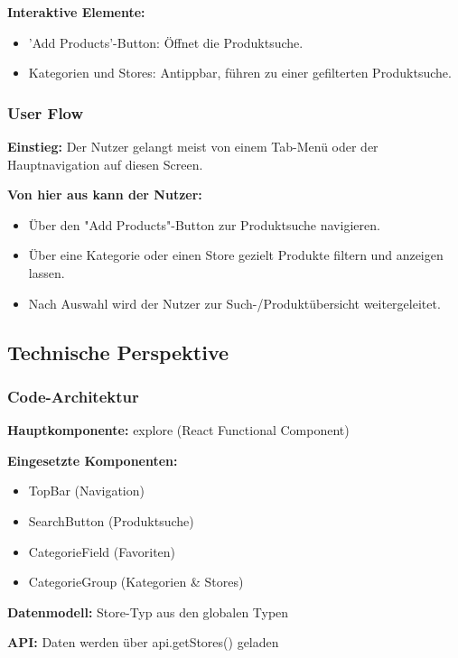 \documentclass[12pt, a4paper]{report} %
\begin{document}
\noindent\textbf{Interaktive Elemente:}
\begin{itemize}
    \item 'Add Products'-Button: Öffnet die Produktsuche.
    \item Kategorien und Stores: Antippbar, führen zu einer gefilterten Produktsuche.
\end{itemize}

\subsubsection{User Flow}

\textbf{Einstieg:} Der Nutzer gelangt meist von einem Tab-Menü oder der Hauptnavigation auf diesen Screen.

\noindent\textbf{Von hier aus kann der Nutzer:}
\begin{itemize}
    \item Über den "Add Products"-Button zur Produktsuche navigieren.
    \item Über eine Kategorie oder einen Store gezielt Produkte filtern und anzeigen lassen.
    \item Nach Auswahl wird der Nutzer zur Such-/Produktübersicht weitergeleitet.
\end{itemize}

\subsection{Technische Perspektive}

\subsubsection{Code-Architektur}

\textbf{Hauptkomponente:} explore (React Functional Component)

\noindent\textbf{Eingesetzte Komponenten:}
\begin{itemize}
    \item TopBar (Navigation)
    \item SearchButton (Produktsuche)
    \item CategorieField (Favoriten)
    \item CategorieGroup (Kategorien \& Stores)
\end{itemize}

\noindent\textbf{Datenmodell:} Store-Typ aus den globalen Typen

\noindent\textbf{API:} Daten werden über api.getStores() geladen
\end{document}
